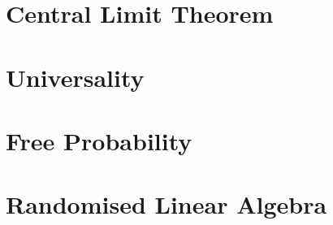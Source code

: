 \documentclass[12pt,a4paper]{book}
\theoremstyle{definition}
\begin{document}
\vfill\eject

\chapter{Central Limit Theorem}


\chapter{Universality}


\chapter{Free Probability}


\chapter{Randomised Linear Algebra}

\end{document}
